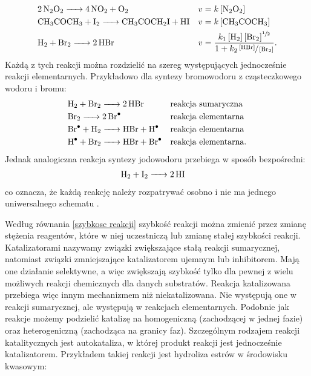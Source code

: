\documentclass[10pt, a4paper, twoside, onecolumn]{article}
\numberwithin{equation}{section}
\begin{document}
	\begin{align*}
		&\ce{2N2O2 -> 4NO2 + O2} &&v=k\left[\ce{N2O2}\right] \\
		&\ce{CH3COCH3 + I2 -> CH3COCH2I + HI} &&v=k\left[\ce{CH3COCH3}\right] \\
		&\ce{H2 + Br2 -> 2HBr} &&v=\frac{k_{1}\left[\ce{H2}\right]\left[\ce{Br2}\right]^{\sfrac{1}{2}}}{1+k_{2}\sfrac{\left[\ce{HBr}\right]}{\left[\ce{Br2}\right]}}.
	\end{align*}
	Każdą z tych reakcji można rozdzielić na szereg występujących jednocześnie reakcji elementarnych. Przykładowo dla syntezy bromowodoru z cząsteczkowego wodoru i bromu:
	\begin{align*}
		&\ce{H2 + Br2 -> 2HBr} &&\text{reakcja sumaryczna} \\
		&\ce{Br2 -> 2Br^{.}} &&\text{reakcja elementarna} \\
		&\ce{Br^{.} + H2 -> HBr + H^{.}} &&\text{reakcja elementarna} \\
		&\ce{H^{.} + Br2 -> HBr + Br^{.}} &&\text{reakcja elementarna}.
	\end{align*}
	Jednak analogiczna reakcja syntezy jodowodoru przebiega w sposób bezpośredni: 
	\begin{align*}
		&\ce{H2 + I2 -> 2HI}
	\end{align*}
	co oznacza, że każdą reakcję należy rozpatrywać osobno i nie ma jednego uniwersalnego schematu \cite{pigon1}. \par
	
	Według równania \eqref{szybkosc reakcji} szybkość reakcji można zmienić przez zmianę stężenia reagentów, które w niej uczestniczą lub zmianę stałej szybkości reakcji. Katalizatorami nazywamy związki zwiększające stałą reakcji sumarycznej, natomiast związki zmniejszające katalizatorem ujemnym lub inhibitorem. Mają one działanie selektywne, a więc zwiększają szybkość tylko dla pewnej z wielu możliwych reakcji chemicznych dla danych substratów. Reakcja katalizowana przebiega więc innym mechanizmem niż niekatalizowana. Nie występują one w reakcji sumarycznej, ale występują w reakcjach elementarnych. Podobnie jak reakcje możemy podzielić katalizę na homogeniczną (zachodzącej w jednej fazie) oraz heterogeniczną (zachodząca na granicy faz). Szczególnym rodzajem reakcji katalitycznych jest autokataliza, w której produkt reakcji jest jednocześnie katalizatorem. Przykładem takiej reakcji jest hydroliza estrów w środowisku kwasowym: \cite{pigon1}
	\begin{center}
	\end{center}
	
\end{document}
